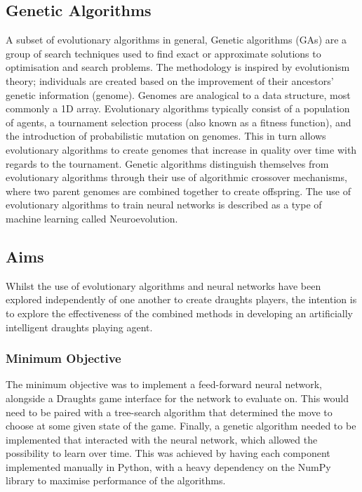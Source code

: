 \documentclass[12pt,a4paper]{article}
\begin{document}
 	\subsection{Genetic Algorithms}

    A subset of evolutionary algorithms in general, Genetic algorithms (GAs) are a group of search techniques used to find exact or approximate solutions to optimisation and search problems. The methodology is inspired by evolutionism theory; individuals are created based on the improvement of their ancestors' genetic information (genome). Genomes are analogical to a data structure, most commonly a 1D array. Evolutionary algorithms typically consist of a population of agents, a tournament selection process (also known as a fitness function), and the introduction of probabilistic mutation on genomes. This in turn allows evolutionary algorithms to create genomes that increase in quality over time with regards to the tournament. Genetic algorithms distinguish themselves from evolutionary algorithms through their use of algorithmic crossover mechanisms, where two parent genomes are combined together to create offspring. The use of evolutionary algorithms to train neural networks is described as a type of machine learning called Neuroevolution.

    \subsection{Aims}

    Whilst the use of evolutionary algorithms and neural networks have been explored independently of one another to create draughts players, the intention is to explore the effectiveness of the combined methods in developing an artificially intelligent draughts playing agent. 

    \subsubsection{Minimum Objective}

        The minimum objective was to implement a feed-forward neural network, alongside a Draughts game interface for the network to evaluate on. This would need to be paired with a tree-search algorithm that determined the move to choose at some given state of the game. Finally, a genetic algorithm needed to be implemented that interacted with the neural network, which allowed the possibility to learn over time. This was achieved by having each component implemented manually in Python, with a heavy dependency on the NumPy library to maximise performance of the algorithms.
\end{document}
